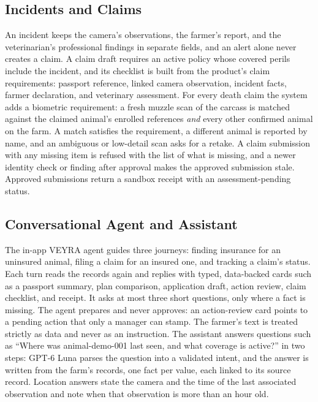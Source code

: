 \documentclass[11pt,letterpaper]{article}
\begin{document}
\subsection{Incidents and Claims}

An incident keeps the camera's observations, the farmer's report, and the veterinarian's professional findings in separate fields, and an alert alone never creates a claim. A claim draft requires an active policy whose covered perils include the incident, and its checklist is built from the product's claim requirements: passport reference, linked camera observation, incident facts, farmer declaration, and veterinary assessment. For every death claim the system adds a biometric requirement: a fresh muzzle scan of the carcass is matched against the claimed animal's enrolled references \emph{and} every other confirmed animal on the farm. A match satisfies the requirement, a different animal is reported by name, and an ambiguous or low-detail scan asks for a retake. A claim submission with any missing item is refused with the list of what is missing, and a newer identity check or finding after approval makes the approved submission stale. Approved submissions return a sandbox receipt with an assessment-pending status.

\subsection{Conversational Agent and Assistant}

The in-app VEYRA agent guides three journeys: finding insurance for an uninsured animal, filing a claim for an insured one, and tracking a claim's status. Each turn reads the records again and replies with typed, data-backed cards such as a passport summary, plan comparison, application draft, action review, claim checklist, and receipt. It asks at most three short questions, only where a fact is missing. The agent prepares and never approves: an action-review card points to a pending action that only a manager can stamp. The farmer's text is treated strictly as data and never as an instruction. The assistant answers questions such as ``Where was animal-demo-001 last seen, and what coverage is active?'' in two steps: GPT-6 Luna parses the question into a validated intent, and the answer is written from the farm's records, one fact per value, each linked to its source record. Location answers state the camera and the time of the last associated observation and note when that observation is more than an hour old.
\end{document}
